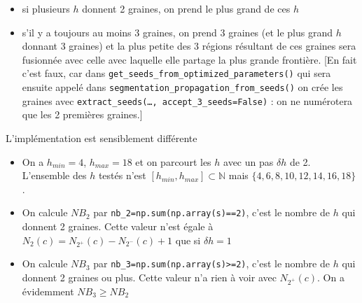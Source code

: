 \documentclass{article}
\begin{document}
\begin{itemize}
\itemsep -0.5ex
\item si plusieurs $h$ donnent 2 graines, on prend le plus grand de ces $h$
\item s'il y a toujours au moins 3 graines, on prend 3 graines (et le plus grand $h$ donnant 3 graines) et la plus petite des 3 r\'egions r\'esultant de ces graines sera fusionn\'ee avec celle avec laquelle elle partage la plus grande fronti\`ere. [En fait c'est faux, car dans \texttt{get\_seeds\_from\_optimized\_parameters()} qui sera ensuite appel\'e dans \texttt{segmentation\_propagation\_from\_seeds()} on cr\'ee les graines avec \texttt{extract\_seeds(\ldots, accept\_3\_seeds=False)} : on ne num\'erotera que les 2 premi\`eres graines.] 
\end{itemize}

L'impl\'ementation est sensiblement diff\'erente
\begin{itemize}
\itemsep -0.5ex
\item On a $h_{min}=4$, $h_{max}=18$ et on parcourt les $h$ avec un pas  $\delta h$ de 2. L'ensemble des $h$ test\'es n'est $[h_{min}, h_{max}] \subset \mathbb{N}$ mais $\{4, 6, 8, 10, 12, 14, 16, 18\}$.
\item On calcule $NB_2$ par \verb|nb_2=np.sum(np.array(s)==2)|, c'est le nombre de $h$ qui donnent 2 graines. Cette valeur n'est \'egale \`a
$N_2(c) =  N_{2^{+}}(c) - N_{2^{-}}(c) +1$ que si $\delta h =1$
\item On calcule $NB_3$ par \verb|nb_3=np.sum(np.array(s)>=2)|, c'est le nombre de $h$ qui donnent 2 graines ou plus. Cette valeur n'a rien \`a voir avec $N_{2^{+}}(c)$. On a \'evidemment $NB_3 \geq NB_2$
\end{itemize}
\end{document}
